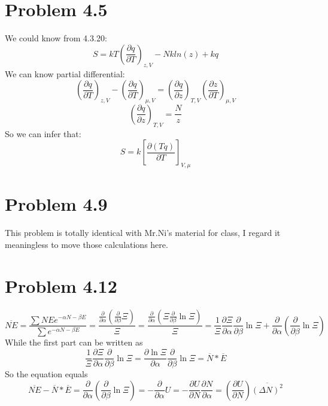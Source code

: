 \documentclass{article}
\begin{document}
\section*{Problem 4.5} %
\label{sec:problem_4_5}
	
	We could know from 4.3.20:
	$$S=kT(\frac{\partial q}{\partial T})_{z,V}-Nkln(z)+kq$$
	We can know partial differential:
	$$(\frac{\partial q}{\partial T})_{z,V}-(\frac{\partial q}{\partial T})_{\mu,V}=(\frac{\partial q}{\partial z})_{T,V}(\frac{\partial z}{\partial T})_{\mu,V}$$
	$$(\frac{\partial q}{\partial z})_{T,V}=\frac{N}{z}$$
	So we can infer that:
	$$S=k[\frac{\partial (Tq)}{\partial{T}}]_{V,\mu}$$
\section*{Problem 4.9}
This problem is totally identical with Mr.Ni's material for class, I regard it meaningless to move those calculations here.

\section*{Problem 4.12}
\begin{equation}
	\overline{NE}=\frac{\sum NE e^{- \alpha N- \beta E}}{\sum e^{-\alpha N-\beta E}}=\frac{\frac{\partial}{\partial \alpha}(\frac{\partial}{\partial \beta}\Xi)}{\Xi}=\frac{\frac{\partial}{\partial \alpha}(\Xi \frac{\partial}{\partial \beta}\ln \Xi)}{\Xi}=\frac{1}{\Xi} \frac{\partial \Xi}{\partial \alpha}\frac{\partial}{\partial \beta}\ln \Xi +\frac{\partial}{\partial \alpha}(\frac{\partial}{\partial \beta}\ln \Xi)
\end{equation}
	While the first part can be written as
\begin{equation}
	\frac{1}{\Xi} \frac{\partial \Xi}{\partial \alpha}\frac{\partial}{\partial \beta}\ln \Xi= \frac{\partial \ln \Xi}{\partial \alpha}\frac{\partial}{\partial \beta}\ln \Xi=\overline{N}* \overline{E}
\end{equation}
	So the equation equals
\begin{equation}
	\overline{NE}-\overline{N}* \overline{E}=\frac{\partial}{\partial \alpha}(\frac{\partial}{\partial \beta}\ln \Xi)=-\frac{\partial}{\partial \alpha} U=-\frac{\partial U}{\partial N}\frac{\partial N}{\partial \alpha}= (\frac{\partial U}{\partial N})\overline{(\Delta N)^2}
\end{equation}
\end{document}
